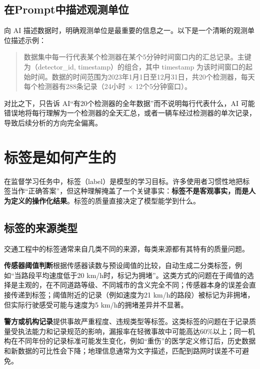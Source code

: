 \subsection{在Prompt中描述观测单位}

向 AI 描述数据时，明确观测单位是最重要的信息之一。以下是一个清晰的观测单位描述示例：

\begin{quote}
数据集中每一行代表某个检测器在某个5分钟时间窗口内的汇总记录。主键为（detector\_id, timestamp）的组合，其中 timestamp 为该时间窗口的起始时间。数据的时间范围为2023年1月1日至12月31日，共20个检测器，每天每个检测器有288条记录（24小时 × 12个5分钟窗口）。
\end{quote}

对比之下，只告诉 AI“有20个检测器的全年数据”而不说明每行代表什么，AI 可能错误地将每行理解为一个检测器的全天汇总，或者一辆车经过检测器的单次记录，导致后续分析的方向完全偏离。

\section{标签是如何产生的}
\label{sec:label}

在监督学习任务中，标签（label）是模型的学习目标。许多使用者习惯性地把标签当作“正确答案”，但这种理解掩盖了一个关键事实：\textbf{标签不是客观事实，而是人为定义的操作化结果}。标签的质量直接决定了模型能学到什么。

\subsection{标签的来源类型}

交通工程中的标签通常来自几类不同的来源，每类来源都有其特有的质量问题。

\textbf{传感器阈值判断}根据传感器读数与预设阈值的比较，自动生成二分类标签，例如“当路段平均速度低于20 km/h时，标记为拥堵”。这类方式的问题在于阈值的选择是主观的，在不同道路等级、不同城市的含义完全不同；传感器本身的误差会直接传递到标签；阈值附近的记录（例如速度为21 km/h的路段）被标记为非拥堵，但实际行驶感受可能与速度为5 km/h的拥堵差异并不显著。

\textbf{警方或机构记录}提供事故严重程度、违规类型等标签。这类标签的问题在于记录质量受执法能力和记录规范的影响，漏报率在轻微事故中可能高达60\%以上；同一机构在不同年份的记录标准可能发生变化，例如“重伤”的医学定义修订后，历史数据和新数据的可比性会下降；地理信息通常为文字描述，匹配到路网时误差不可避免。


